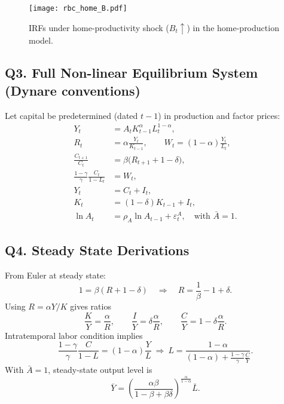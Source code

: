 \documentclass[a4paper,12pt]{article}
\theoremstyle{nonitalic}
\begin{document}
\begin{figure}[H]
  \centering
  \texttt{[image: rbc\_home\_B.pdf]}
  \caption{IRFs under home-productivity shock ($B_t\uparrow$) in the home-production model.}
  \label{fig:rbc_home_B_irf}
\end{figure}
\FloatBarrier
\subsection{Q3. Full Non-linear Equilibrium System (Dynare conventions)}
Let capital be predetermined (dated $t-1$) in production and factor prices:
\begin{align}
Y_t &= A_t K_{t-1}^{\alpha} L_t^{1-\alpha},\\
R_t &= \alpha \frac{Y_t}{K_{t-1}},\qquad W_t=(1-\alpha)\frac{Y_t}{L_t},\\
\frac{C_{t+1}}{C_t} &= \beta \big(R_{t+1}+1-\delta\big),\\
\frac{1-\gamma}{\gamma}\frac{C_t}{1-L_t} &= W_t,\\
Y_t &= C_t + I_t,\\
K_t &= (1-\delta)K_{t-1}+I_t,\\
\ln A_t &= \rho_A \ln A_{t-1} + \varepsilon^A_t,\quad \text{with } \bar A=1.
\end{align}

\subsection{Q4. Steady State Derivations}
From Euler at steady state:
\begin{equation}
1=\beta(R+1-\delta)\quad \Rightarrow\quad R=\frac{1}{\beta}-1+\delta.
\end{equation}
Using $R=\alpha Y/K$ gives ratios
\begin{equation}
\frac{K}{Y}=\frac{\alpha}{R},\qquad \frac{I}{Y}=\delta \frac{\alpha}{R},\qquad \frac{C}{Y}=1-\delta\frac{\alpha}{R}.
\end{equation}
Intratemporal labor condition implies
\begin{equation}
\frac{1-\gamma}{\gamma}\frac{C}{1-L}=(1-\alpha)\frac{Y}{L}
\ \Rightarrow\
L=\frac{1-\alpha}{(1-\alpha)+\frac{1-\gamma}{\gamma}\frac{C}{Y}}.
\end{equation}
With $\bar A=1$, steady-state output level is
\begin{equation}
\bar Y= \left(\frac{\alpha\beta}{1-\beta+\beta\delta}\right)^{\frac{\alpha}{1-\alpha}} \bar L.
\end{equation}
\end{document}
